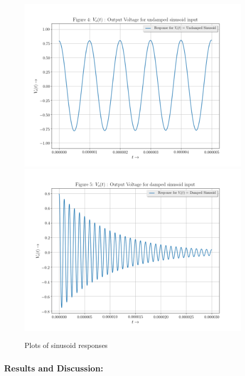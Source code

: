 \documentclass[11pt, a4paper]{article}
\begin{document}
\begin{figure}[!tbh]
  \centering
  \includegraphics[scale=0.4]{./../Extras/A74.png}  %
  \includegraphics[scale=0.4]{./../Extras/A75.png}  %
 
  \caption{Plots of sinusoid responses}
\end{figure}

\newpage
\subsubsection{Results and Discussion:}\label{results-and-discussion}
\end{document}

